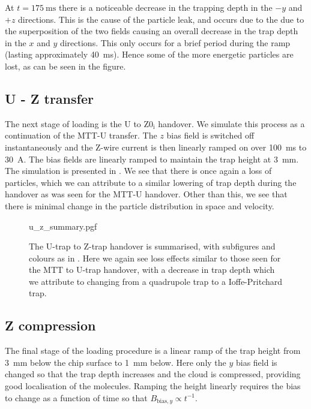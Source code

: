 At $t=\SI{175}{\milli\second}$ there is a noticeable decrease in the trapping
depth in the $-y$ and $+z$ directions. This is the cause of the particle leak,
and occurs due to the due to the superposition of the two fields causing an
overall decrease in the trap depth in the $x$ and $y$ directions. This only
occurs for a brief period during the ramp (lasting approximately
\SI{40}{\milli\second}).  Hence some of the more energetic particles are lost,
as can be seen in the figure.

\subsection{U - Z transfer}
\label{design:sim:U_to_Z0i}

The next stage of loading is the U to $\mathrm{Z0_i}$ handover. We simulate
this process as a continuation of the MTT-U transfer. 
The $z$
bias field is switched off instantaneously and the Z-wire current is then linearly
ramped on over \SI{100}{\milli\second} to \SI{30}{\ampere}. The bias fields are
linearly ramped to maintain the trap height at \SI{3}{\milli\meter}.
%
The simulation is presented in . We see that there
is once again a loss of particles, which we can attribute to a similar lowering
of trap depth during the handover as was seen for the MTT-U handover.  Other
than this, we see that there is minimal change in the particle distribution in
space and velocity.

\begin{figure}[p]
\centering
  {u_z_summary.pgf}
  \caption{
    The U-trap to Z-trap handover is summarised, with subfigures and colours as
    in . Here we again see loss effects similar
    to those seen for the MTT to U-trap handover, with a decrease in trap depth
    which we attribute to changing from a quadrupole trap to a Ioffe-Pritchard
    trap.
  }
  \label{design:fig:uzsim}
\end{figure}

\subsection{Z compression}

The final stage of the loading procedure is a linear ramp of the trap height
from \SI{3}{\milli\meter} below the chip surface to \SI{1}{\milli\meter} below.
Here only the $y$ bias field is changed so  that the trap depth
increases and the cloud is compressed, providing good localisation of the
molecules. Ramping the height linearly requires the bias to change as a
function of time so that $B_{\text{bias}, y} \propto t^{-1}$.

